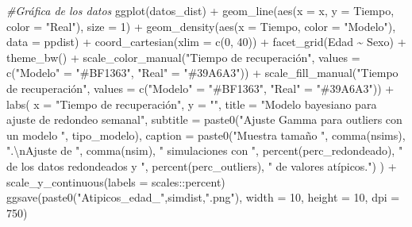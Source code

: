 \documentclass[
]{article}
\newenvironment{Shaded}{\begin{snugshade}}{\end{snugshade}}
\newcommand{\AttributeTok}[1]{\textcolor[rgb]{0.77,0.63,0.00}{#1}}
\newcommand{\CommentTok}[1]{\textcolor[rgb]{0.56,0.35,0.01}{\textit{#1}}}
\newcommand{\DecValTok}[1]{\textcolor[rgb]{0.00,0.00,0.81}{#1}}
\newcommand{\FunctionTok}[1]{\textcolor[rgb]{0.00,0.00,0.00}{#1}}
\newcommand{\NormalTok}[1]{#1}
\newcommand{\OtherTok}[1]{\textcolor[rgb]{0.56,0.35,0.01}{#1}}
\newcommand{\SpecialCharTok}[1]{\textcolor[rgb]{0.00,0.00,0.00}{#1}}
\newcommand{\StringTok}[1]{\textcolor[rgb]{0.31,0.60,0.02}{#1}}
\begin{document}
\begin{Shaded}
\begin{Highlighting}[]
\CommentTok{\#Gráfica de los datos}
\FunctionTok{ggplot}\NormalTok{(datos\_dist) }\SpecialCharTok{+}
  \FunctionTok{geom\_line}\NormalTok{(}\FunctionTok{aes}\NormalTok{(}\AttributeTok{x =}\NormalTok{ x, }\AttributeTok{y =}\NormalTok{ Tiempo, }\AttributeTok{color =} \StringTok{"Real"}\NormalTok{), }\AttributeTok{size =} \DecValTok{1}\NormalTok{) }\SpecialCharTok{+}
  \FunctionTok{geom\_density}\NormalTok{(}\FunctionTok{aes}\NormalTok{(}\AttributeTok{x =}\NormalTok{ Tiempo, }\AttributeTok{color =} \StringTok{"Modelo"}\NormalTok{), }\AttributeTok{data =}\NormalTok{ ppdist) }\SpecialCharTok{+}
  \FunctionTok{coord\_cartesian}\NormalTok{(}\AttributeTok{xlim =} \FunctionTok{c}\NormalTok{(}\DecValTok{0}\NormalTok{, }\DecValTok{40}\NormalTok{)) }\SpecialCharTok{+}
  \FunctionTok{facet\_grid}\NormalTok{(Edad }\SpecialCharTok{\textasciitilde{}}\NormalTok{ Sexo) }\SpecialCharTok{+}
  \FunctionTok{theme\_bw}\NormalTok{() }\SpecialCharTok{+}
  \FunctionTok{scale\_color\_manual}\NormalTok{(}\StringTok{"Tiempo de recuperación"}\NormalTok{,}
                     \AttributeTok{values =} \FunctionTok{c}\NormalTok{(}\StringTok{"Modelo"} \OtherTok{=} \StringTok{"\#BF1363"}\NormalTok{,}
                                \StringTok{"Real"} \OtherTok{=} \StringTok{"\#39A6A3"}\NormalTok{)) }\SpecialCharTok{+}
  \FunctionTok{scale\_fill\_manual}\NormalTok{(}\StringTok{"Tiempo de recuperación"}\NormalTok{,}
                    \AttributeTok{values =} \FunctionTok{c}\NormalTok{(}\StringTok{"Modelo"} \OtherTok{=} \StringTok{"\#BF1363"}\NormalTok{,}
                               \StringTok{"Real"} \OtherTok{=} \StringTok{"\#39A6A3"}\NormalTok{)) }\SpecialCharTok{+}
  \FunctionTok{labs}\NormalTok{(}
    \AttributeTok{x =} \StringTok{"Tiempo de recuperación"}\NormalTok{, }
    \AttributeTok{y =} \StringTok{""}\NormalTok{,}
    \AttributeTok{title =} \StringTok{"Modelo bayesiano para ajuste de redondeo semanal"}\NormalTok{,}
    \AttributeTok{subtitle =} \FunctionTok{paste0}\NormalTok{(}\StringTok{"Ajuste Gamma para outliers con un modelo "}\NormalTok{, tipo\_modelo),}
    \AttributeTok{caption =} \FunctionTok{paste0}\NormalTok{(}\StringTok{"Muestra tamaño "}\NormalTok{, }\FunctionTok{comma}\NormalTok{(nsims), }\StringTok{".}\SpecialCharTok{\textbackslash{}n}\StringTok{Ajuste de "}\NormalTok{, }
                     \FunctionTok{comma}\NormalTok{(nsim), }\StringTok{" simulaciones con "}\NormalTok{,}
                     \FunctionTok{percent}\NormalTok{(perc\_redondeado), }\StringTok{" de los datos redondeados y "}\NormalTok{, }
                     \FunctionTok{percent}\NormalTok{(perc\_outliers), }\StringTok{" de valores atípicos."}\NormalTok{)}
\NormalTok{  ) }\SpecialCharTok{+}
  \FunctionTok{scale\_y\_continuous}\NormalTok{(}\AttributeTok{labels =}\NormalTok{ scales}\SpecialCharTok{::}\NormalTok{percent)}
\FunctionTok{ggsave}\NormalTok{(}\FunctionTok{paste0}\NormalTok{(}\StringTok{"Atipicos\_edad\_"}\NormalTok{,simdist,}\StringTok{".png"}\NormalTok{), }\AttributeTok{width =} \DecValTok{10}\NormalTok{, }\AttributeTok{height =} \DecValTok{10}\NormalTok{, }\AttributeTok{dpi =} \DecValTok{750}\NormalTok{)}
\end{Highlighting}
\end{Shaded}
\end{document}
